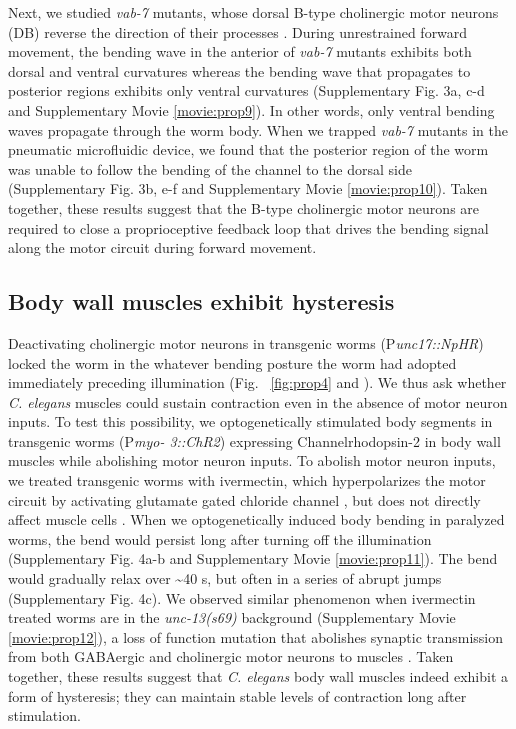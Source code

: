 Next, we studied \textit{vab-7} mutants, whose dorsal B-type cholinergic motor neurons (DB) reverse 
the direction of their processes \citep{esmaeili_c._2002}. During unrestrained forward movement, the bending wave 
in the anterior of \textit{vab-7} mutants exhibits both dorsal and ventral curvatures whereas the bending 
wave that propagates to posterior regions exhibits only ventral curvatures (Supplementary Fig. 
3a, c-d and Supplementary Movie  \ref{movie:prop9}). In other words, only ventral bending waves propagate 
through the worm body. When we trapped \textit{vab-7} mutants in the pneumatic microfluidic device, 
we found that the posterior region of the worm was unable to follow the bending of the channel 
to the dorsal side (Supplementary Fig. 3b, e-f and Supplementary Movie  \ref{movie:prop10}). Taken together, 
these results suggest that the B-type cholinergic motor neurons are required to close a 
proprioceptive feedback loop that drives the bending signal along the motor circuit during 
forward movement. 


\subsection{Body wall muscles exhibit hysteresis}
 
Deactivating cholinergic motor neurons in transgenic worms (P\textit{unc17::NpHR}) locked the worm 
in the whatever bending posture the worm had adopted immediately preceding illumination (Fig. ~\ref{fig:prop4} and  \citep{leifer_optogenetic_2011}). We thus ask 
whether \textit{C. elegans} muscles could sustain contraction even in the absence of motor neuron inputs. 
To test this possibility, we optogenetically stimulated body segments in transgenic worms (P\textit{myo- 3::ChR2}) expressing Channelrhodopsin-2 in body wall muscles while abolishing motor neuron 
inputs. To abolish motor neuron inputs, we treated transgenic worms with ivermectin, which 
hyperpolarizes the motor circuit by activating glutamate gated chloride channel \citep{dent_genetics_2000,cully_cloning_1994}, but 
does not directly affect muscle cells \citep{hart_behavior_2006}. When we optogenetically induced body bending in 
paralyzed worms, the bend would persist long after turning off the illumination (Supplementary 
Fig. 4a-b and Supplementary Movie  \ref{movie:prop11}). The bend would gradually relax over \textasciitilde40 s, but often in 
a series of abrupt jumps (Supplementary Fig. 4c). We observed similar phenomenon when 
ivermectin treated worms are in the \textit{unc-13(s69)} background (Supplementary Movie  \ref{movie:prop12}), a loss 
of function mutation that abolishes synaptic transmission from both GABAergic and cholinergic 
motor neurons to muscles \citep{richmond_unc-13_1999}. Taken together, these results suggest that \textit{C. elegans} body wall 
muscles indeed exhibit a form of hysteresis; they can maintain stable levels of contraction long after stimulation.  

